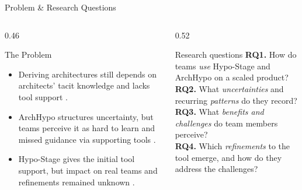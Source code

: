 \documentclass[
  xcolor={hyperref,svgnames,x11names,table},
  hyperref={pdfencoding=unicode,plainpages=false,pdfpagelabels=true,breaklinks=true},
  brazilian,english,12pt,aspectratio=169,
]{beamer}
\begin{document}
\begin{frame}{Problem \& Research Questions}
  \begin{columns}[T]
    \begin{column}{0.46\textwidth}
      \begin{block}{The Problem}
        \scriptsize
        \begin{itemize}\setlength\itemsep{0.45em}
          \item Deriving architectures still depends on architects'
                \alert{tacit knowledge} and lacks \alert{tool support}
                \citep{souza2019}.
          \item ArchHypo structures uncertainty, but teams perceive it as \alert{hard to learn}
                and missed guidance via supporting tools \citep{silva2024tse,silva2024ieeesw}.
          \item Hypo-Stage gives the initial tool support, but 
                \alert{impact on real teams} and refinements remained
                \alert{unknown} \citep{correa2025}.
        \end{itemize}
      \end{block}
    \end{column}
    \begin{column}{0.52\textwidth}
      \begin{block}{Research questions}
        \footnotesize
        \textbf{RQ1.} How do teams \emph{use} Hypo-Stage and ArchHypo on a
        scaled product?\\[0.6em]
        \textbf{RQ2.} What \emph{uncertainties} and recurring \emph{patterns}
        do they record?\\[0.6em]
        \textbf{RQ3.} What \emph{benefits and challenges} do team members
        perceive?\\[0.6em]
        \textbf{RQ4.} Which \emph{refinements} to the tool emerge, and how do
        they address the challenges?
      \end{block}
    \end{column}
  \end{columns}
\end{frame}
\end{document}
